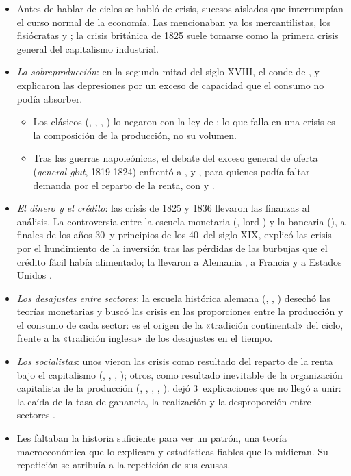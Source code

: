 \documentclass[11pt]{article}
\begin{document}
\begin{itemize}
\item Antes de hablar de ciclos se habló de crisis, sucesos aislados que interrumpían el curso normal de la economía. Las mencionaban ya los mercantilistas, los fisiócratas y ; la crisis británica de 1825 suele tomarse como la primera crisis general del capitalismo industrial.
\item \emph{La sobreproducción}: en la segunda mitad del siglo XVIII, el conde de ,  y  explicaron las depresiones por un exceso de capacidad que el consumo no podía absorber.
  \begin{itemize}
  \item Los clásicos (, , , ) lo negaron con la ley de \nocite{Say1803Traite}: lo que falla en una crisis es la composición de la producción, no su volumen.
  \item Tras las guerras napoleónicas, el debate del exceso general de oferta (\emph{general glut}, 1819-1824) enfrentó a ,  y , para quienes podía faltar demanda por el reparto de la renta, con  y \nocite{Sismondi1819Nouveaux,Malthus1820Principles,Say1820Lettres} .
  \end{itemize}
\item \emph{El dinero y el crédito}: las crisis de 1825 y 1836 llevaron las finanzas al análisis. La controversia entre la escuela monetaria (, lord ) y la bancaria (), a finales de los años 30~y principios de los 40~del siglo XIX, explicó las crisis por el hundimiento de la inversión tras las pérdidas de las burbujas que el crédito fácil había alimentado; la llevaron a Alemania , a Francia  y a Estados Unidos .
\item \emph{Los desajustes entre sectores}: la escuela histórica alemana (, , ) desechó las teorías monetarias y buscó las crisis en las proporciones entre la producción y el consumo de cada sector: es el origen de la «tradición continental» del ciclo, frente a la «tradición inglesa» de los desajustes en el tiempo.
\item \emph{Los socialistas}: unos vieron las crisis como resultado del reparto de la renta bajo el capitalismo (, , , ); otros, como resultado inevitable de la organización capitalista de la producción (, , , , ).  dejó 3~explicaciones que no llegó a unir: la caída de la tasa de ganancia, la realización y la desproporción entre sectores .
\item Les faltaban la historia suficiente para ver un patrón, una teoría macroeconómica que lo explicara y estadísticas fiables que lo midieran. Su repetición se atribuía a la repetición de sus causas.
\end{itemize}
\end{document}
